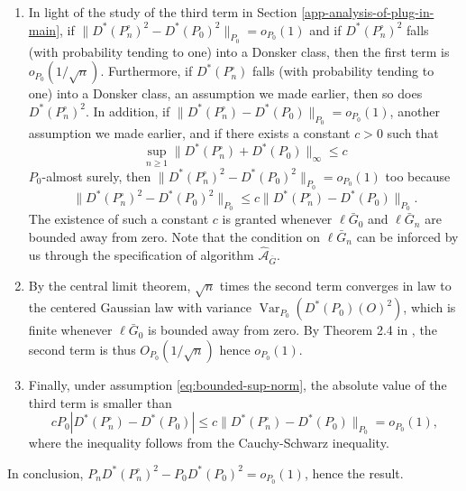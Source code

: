 \documentclass[11pt,openright,twoside]{book}
\DeclareMathOperator{\Var}{Var}
\newcommand{\Algo}{\widehat{\mathcal{A}}}
\newcommand{\Gbar}{\bar{G}}
\newcommand{\Phat}{P^{\circ}}
\theoremstyle{definition}
\theoremstyle{definition}
\theoremstyle{definition}
\theoremstyle{remark}
\begin{document}
\begin{enumerate}
\def\labelenumi{\arabic{enumi}.}
\item
  In light of the study of the third term in Section
  \ref{app-analysis-of-plug-in-main}, if \(\|D^*(\Phat_n)^2 - D^*(P_0)^2\|_{P_{0}} = o_{P_0} (1)\) and if \(D^*(\Phat_n)^{2}\) falls (with
  probability tending to one) into a Donsker class, then the first term is
  \(o_{P_0}(1/\sqrt{n})\). Furthermore, if \(D^*(\Phat_n)\) falls (with
  probability tending to one) into a Donsker class, an assumption we made
  earlier, then so does \(D^*(\Phat_n)^{2}\). In addition, if
  \(\|D^*(\Phat_n) - D^*(P_0)\|_{P_{0}} = o_{P_0} (1)\), another assumption we
  made earlier, and if there exists a constant \(c>0\) such that
  \begin{equation} \sup_{n \geq 1}  \|D^*(\Phat_n) + D^*(P_0)\|_{\infty} \leq
  c \label{eq:bounded-sup-norm}  \end{equation} \(P_{0}\)-almost surely, then \(\|D^*(\Phat_n)^2 - D^*(P_0)^2\|_{P_{0}} = o_{P_0} (1)\) too because \begin{equation}
  \|D^*(\Phat_n)^2   -   D^*(P_0)^2\|_{P_{0}}   \leq   c   \|D^*(\Phat_n)   -
  D^*(P_0)\|_{P_{0}}.  \end{equation} The existence of such a constant \(c\) is
  granted whenever \(\ell\Gbar_{0}\) and \(\ell\Gbar_{n}\) are bounded away from
  zero. Note that the condition on \(\ell\Gbar_{n}\) can be inforced by us
  through the specification of algorithm \(\Algo_{\Gbar}\).
\item
  By the central limit theorem, \(\sqrt{n}\) times the second term converges in
  law to the centered Gaussian law with variance \(\Var_{P_{0}} (D^{*} (P_{0})(O)^2)\), which is finite whenever \(\ell\Gbar_{0}\) is bounded away
  from zero. By Theorem 2.4 in \citep{vdV98}, the second term is thus \(O_{P_0} (1/\sqrt{n})\) hence \(o_{P_0} (1)\).
\item
  Finally, under assumption \eqref{eq:bounded-sup-norm}, the absolute value of
  the third term is smaller than \begin{equation}c  P_{0} |D^*(\Phat_n)  -
  D^*(P_0)|     \leq    c     \|D^*(\Phat_n)    -     D^*(P_0)\|_{P_{0}}    =
  o_{P_0}(1),\end{equation} where the inequality follows from the
  Cauchy-Schwarz inequality.
\end{enumerate}

In conclusion, \(P_{n} D^{*} (\Phat_n)^2 - P_{0} D^{*} (P_{0})^2 = o_{P_0}(1)\),
hence the result.
\end{document}
